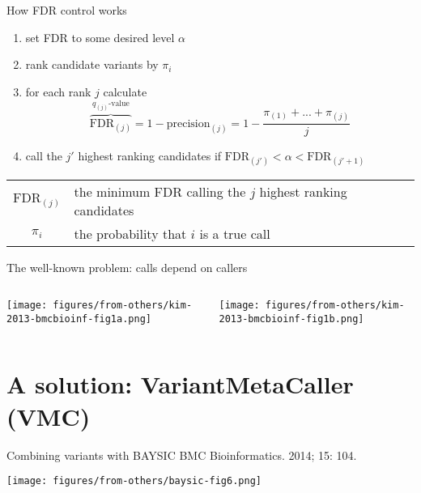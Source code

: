 \documentclass{beamer} %
\begin{document}
\begin{frame}{How FDR control works}

\begin{enumerate}
\item set FDR to some desired level \(\alpha\)
\item rank candidate variants by \(\pi_i\) 
\item for each rank \(j\) calculate
\begin{equation*}
\overbrace{\text{FDR}_{(j)}}^{q_{(j)} \text{-value}} = 1 - \text{precision}_{(j)} = 1 -
\frac{\pi_{(1)} + ... + \pi_{(j)}}{j}
\end{equation*}
\item call the \(j'\) highest ranking candidates if \(\text{FDR}_{(j')} <
\alpha < \text{FDR}_{(j'+1)}\)

\end{enumerate}

\bigskip
{\footnotesize
\begin{tabular}{cl}
\hline
\(\text{FDR}_{(j)}\) & the minimum FDR calling the \(j\) highest ranking candidates \\
\(\pi_i\) & the probability that \(i\) is a true call \\
\end{tabular}
}
\end{frame}

\begin{frame}{The well-known problem: calls depend on callers}
\begin{columns}[t]
\begin{column}{0.5\textwidth}

\texttt{[image: figures/from-others/kim-2013-bmcbioinf-fig1a.png]}
\end{column}
\begin{column}{0.5\textwidth}

\texttt{[image: figures/from-others/kim-2013-bmcbioinf-fig1b.png]}
\end{column}
\end{columns}
\end{frame}

\section{A solution: VariantMetaCaller (VMC)}

\begin{frame}{Combining variants with BAYSIC}
{BMC Bioinformatics. 2014; 15: 104.}

\texttt{[image: figures/from-others/baysic-fig6.png]}
\end{frame}
\end{document}
